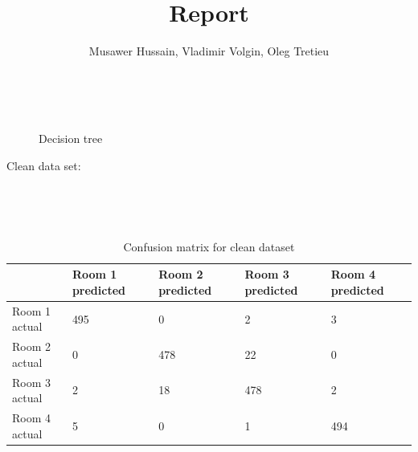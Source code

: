 \documentclass{article}
\begin{document}
\title{Report}

\author{Musawer Hussain, Vladimir Volgin, Oleg Tretieu}

\maketitle

\

\begin{figure}[h]
  \centering
  \caption{Decision tree}
\end{figure}
\pagebreak 

\begin{center}
Clean data set:
\end{center}
  \\

\renewcommand{\arraystretch}{2}
\begin{table}[htb]
  \centering
  \caption{Confusion matrix for clean dataset} \\
  \begin{tabular}{|l|l|l|l|l|}
  \hline
                & Room 1 predicted & Room 2 predicted & Room 3 predicted & Room 4 predicted \\ \hline
  Room 1 actual & 495              & 0                & 2                & 3                \\ \hline
  Room 2 actual & 0                & 478              & 22               & 0                \\ \hline
  Room 3 actual & 2                & 18               & 478              & 2                \\ \hline
  Room 4 actual & 5                & 0                & 1                & 494              \\ \hline
  \end{tabular}
\end{table}
\end{document}
